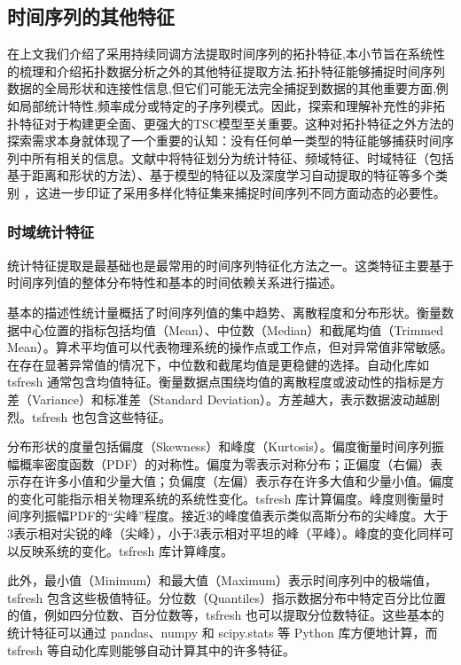     \subsection{时间序列的其他特征}
        \label{sec:other_ts_features}
        在上文我们介绍了采用持续同调方法提取时间序列的拓扑特征,本小节旨在系统性的梳理和介绍拓扑数据分析之外的其他特征提取方法.拓扑特征能够捕捉时间序列数据的全局形状和连接性信息,但它们可能无法完全捕捉到数据的其他重要方面,例如局部统计特性,频率成分或特定的子序列模式。因此，探索和理解补充性的非拓扑特征对于构建更全面、更强大的TSC模型至关重要。这种对拓扑特征之外方法的探索需求本身就体现了一个重要的认知：没有任何单一类型的特征能够捕获时间序列中所有相关的信息。文献中将特征划分为统计特征、频域特征、时域特征（包括基于距离和形状的方法）、基于模型的特征以及深度学习自动提取的特征等多个类别 ，这进一步印证了采用多样化特征集来捕捉时间序列不同方面动态的必要性。
        \subsubsection{时域统计特征}
            \label{sec:ts_distances}
            统计特征提取是最基础也是最常用的时间序列特征化方法之一。这类特征主要基于时间序列值的整体分布特性和基本的时间依赖关系进行描述。

            基本的描述性统计量概括了时间序列值的集中趋势、离散程度和分布形状。衡量数据中心位置的指标包括均值（Mean）、中位数（Median）和截尾均值（Trimmed Mean）。算术平均值可以代表物理系统的操作点或工作点，但对异常值非常敏感。在存在显著异常值的情况下，中位数和截尾均值是更稳健的选择。自动化库如 tsfresh 通常包含均值特征。衡量数据点围绕均值的离散程度或波动性的指标是方差（Variance）和标准差（Standard Deviation）。方差越大，表示数据波动越剧烈。tsfresh 也包含这些特征。

            分布形状的度量包括偏度（Skewness）和峰度（Kurtosis）。偏度衡量时间序列振幅概率密度函数（PDF）的对称性。偏度为零表示对称分布；正偏度（右偏）表示存在许多小值和少量大值；负偏度（左偏）表示存在许多大值和少量小值。偏度的变化可能指示相关物理系统的系统性变化。tsfresh 库计算偏度。峰度则衡量时间序列振幅PDF的“尖峰”程度。接近3的峰度值表示类似高斯分布的尖峰度。大于3表示相对尖锐的峰（尖峰），小于3表示相对平坦的峰（平峰）。峰度的变化同样可以反映系统的变化。tsfresh 库计算峰度。

            此外，最小值（Minimum）和最大值（Maximum）表示时间序列中的极端值，tsfresh 包含这些极值特征。分位数（Quantiles）指示数据分布中特定百分比位置的值，例如四分位数、百分位数等，tsfresh 也可以提取分位数特征。这些基本的统计特征可以通过 pandas、numpy 和 scipy.stats 等 Python 库方便地计算，而 tsfresh 等自动化库则能够自动计算其中的许多特征。

